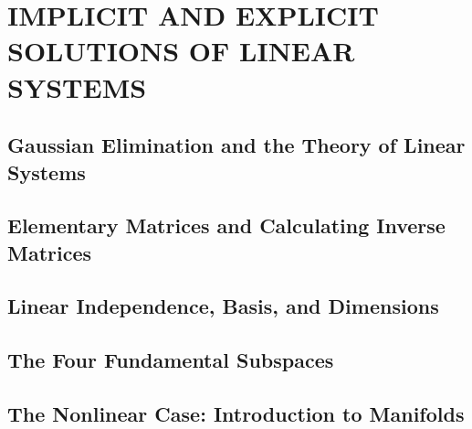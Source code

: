 \section{IMPLICIT AND EXPLICIT SOLUTIONS OF LINEAR SYSTEMS}
\subsection{Gaussian Elimination and the Theory of Linear Systems}
\subsection{Elementary Matrices and Calculating Inverse Matrices}
\subsection{Linear Independence, Basis, and Dimensions}
\subsection{The Four Fundamental Subspaces}
\subsection{The Nonlinear Case: Introduction to Manifolds}
